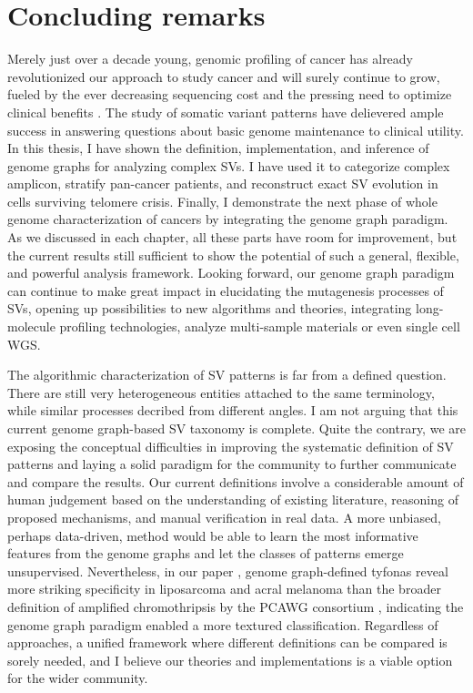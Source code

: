 \documentclass[phd,tocprelim]{cornell}
\begin{document}
\chapter{Concluding remarks} \label{chap:conclude}
Merely just over a decade young, genomic profiling of cancer has already revolutionized our approach to study cancer and will surely continue to grow, fueled by the ever decreasing sequencing cost and the pressing need to optimize clinical benefits \cite{Stratton2009-ty}. The study of somatic variant patterns have delievered ample success in answering questions about basic genome maintenance to clinical utility. In this thesis, I have shown the definition, implementation, and inference of genome graphs for analyzing complex SVs. I have used it to categorize complex amplicon, stratify pan-cancer patients, and reconstruct exact SV evolution in cells surviving telomere crisis. Finally,  I demonstrate the next phase of whole genome characterization of cancers by integrating the genome graph paradigm. As we discussed in each chapter, all these parts have room for improvement, but the current results still sufficient to show the potential of such a general, flexible, and powerful analysis framework. Looking forward, our genome graph paradigm can continue to make great impact in elucidating the mutagenesis processes of SVs, opening up possibilities to new algorithms and theories, integrating long-molecule profiling technologies, analyze multi-sample materials or even single cell WGS.

The algorithmic characterization of SV patterns is far from a defined question. There are still very heterogeneous entities attached to the same terminology, while similar processes decribed from different angles. I am not arguing that this current genome graph-based SV taxonomy is complete. Quite the contrary, we are exposing the conceptual difficulties in improving the systematic definition of SV patterns and laying a solid paradigm for the community to further communicate and compare the results. Our current definitions involve a considerable amount of human judgement based on the understanding of existing literature, reasoning of proposed mechanisms, and manual verification in real data. A more unbiased, perhaps data-driven, method would be able to learn the most informative features from the genome graphs and let the classes of patterns emerge unsupervised. Nevertheless, in our paper \cite{Hadi2020-um}, genome graph-defined tyfonas reveal more striking specificity in liposarcoma and acral melanoma than the broader definition of amplified chromothripsis by the PCAWG consortium \cite{pcawg_marker2020-yi}, indicating the genome graph paradigm enabled a more textured classification. Regardless of approaches, a unified framework where different definitions can be compared is sorely needed, and I believe our theories and implementations is a viable option for the wider community.
\end{document}
